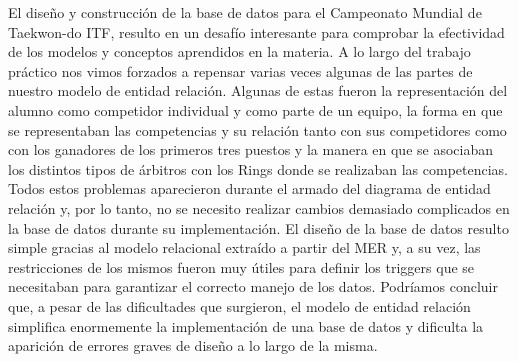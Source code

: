 El diseño y construcción de la base de datos para el Campeonato Mundial de Taekwon-do ITF, resulto en un desafío interesante
para comprobar la efectividad de los modelos y conceptos aprendidos en la materia.
 A lo largo del trabajo práctico nos vimos forzados a repensar varias veces algunas de las partes de nuestro modelo de entidad relación. Algunas de estas fueron la representación del alumno como
competidor individual y como parte de un equipo, la forma en que se representaban las competencias y su relación tanto con
sus competidores como con los ganadores de los primeros tres puestos y la manera en que se asociaban los distintos tipos de
árbitros con los Rings donde se realizaban las competencias. Todos estos problemas aparecieron durante el armado del diagrama de entidad
relación y, por lo tanto, no se necesito realizar cambios demasiado complicados en la base de datos durante su implementación. El diseño de la base de datos resulto simple gracias al modelo
relacional extraído a partir del MER y, a su vez, las restricciones de los mismos fueron muy útiles
para definir los triggers que se necesitaban para garantizar el correcto manejo de los datos. Podríamos concluir que, a pesar de las dificultades que surgieron,
el modelo de entidad relación simplifica enormemente la implementación de una base de datos y dificulta la aparición de
errores graves de diseño a lo largo de la misma.
